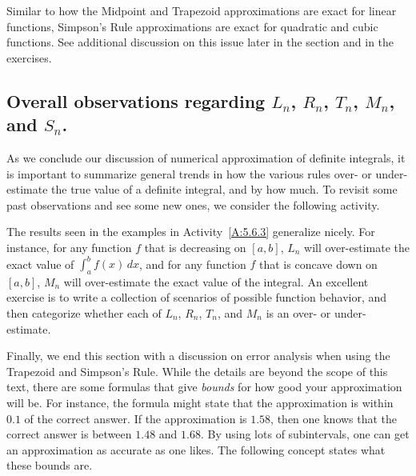 Similar to how the Midpoint and Trapezoid approximations are exact for linear functions, Simpson's Rule approximations are exact for quadratic and cubic functions.  See additional discussion on this issue later in the section and in the exercises.


\subsection*{Overall observations regarding $L_n$, $R_n$, $T_n$, $M_n$, and $S_n$.}

As we conclude our discussion of numerical approximation of definite integrals, it is important to summarize general trends in how the various rules over- or under-estimate the true value of a definite integral, and by how much.  To revisit some past observations and see some new ones, we consider the following activity.


The results seen in the examples in Activity~\ref{A:5.6.3} generalize nicely.  For instance, for any function $f$ that is decreasing on $[a,b]$, $L_n$ will over-estimate the exact value of $\int_a^b f(x) \,dx$, and for any function $f$ that is concave down on $[a,b]$, $M_n$ will over-estimate the exact value of the integral.  An excellent exercise is to write a collection of scenarios of possible function behavior, and then categorize whether each of $L_n$, $R_n$, $T_n$, and $M_n$ is an over- or under-estimate.

Finally, we end this section with a discussion on error analysis when using the Trapezoid and Simpson's Rule. While the details are beyond the scope of this text, there are some formulas that give \textit{bounds} for how good your approximation will be. For instance, the formula might state that the approximation is within $0.1$ of the correct answer. If the approximation is $1.58$, then one knows that the correct answer is between $1.48$ and $1.68$. By using lots of subintervals, one can get an approximation as accurate as one likes. The following concept states what these bounds are.

